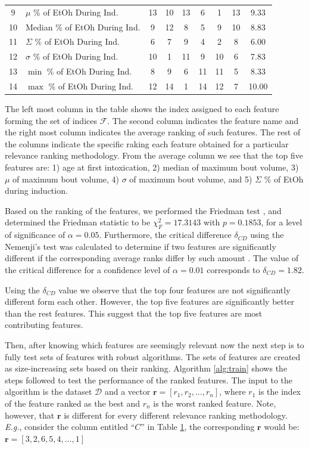 \documentclass{bmcart}
\begin{document}
\begin{table}[t]
\begin{tabular}{clccccccc}
9  & $\mu$ \% of EtOh During Ind.    &  13 &    10 &  13 &    6 &        1 &      13 &  9.33 \\
10 & Median \% of EtOh During Ind.   &   9 &    12 &   8 &    5 &        9 &      10 &  8.83 \\
11 & $\Sigma$ \% of EtOh During Ind. &   6 &     7 &   9 &    4 &        2 &       8 &  6.00 \\
12 & $\sigma$ \% of EtOh During Ind. &  10 &     1 &  11 &    9 &       10 &       6 &  7.83 \\
13 & $\min$ \% of EtOh During Ind.   &   8 &     9 &   6 &   11 &       11 &       5 &  8.33 \\ 
14 & $\max$ \% of EtOh During Ind.   &  12 &    14 &   1 &   14 &       12 &       7 & 10.00 \\ \hline
      \end{tabular}
\label{tbl:ranking}
\end{table}
The left most column in the table shows the index assigned to each feature
forming the set of indices $\mathcal{F}$. The second column 
indicates the feature name and the right most column
indicates the average ranking of such features. The rest of the columns
indicate the specific raking each feature obtained for a particular relevance
ranking methodology. From the average column we see that the top five features
are: 1) age at first intoxication, 2) median of maximum bout volume, 3) $\mu$ 
of maximum bout volume, 4) $\sigma$ of maximum bout volume, and 5) $\Sigma$ 
\% of EtOh during induction.

Based on the ranking of the features, 
we performed the Friedman test \cite{demvsar2006statistical}, and determined
the Friedman statistic to be $\chi_F^2 = 17.3143$ with $p=0.1853$, for
a level of significance of $\alpha=0.05$.  Furthermore, the critical difference
$\delta_{CD}$ using the Nemenji's test was calculated to determine if two
features are significantly different if the corresponding average ranks differ
by such amount \cite{garcia2010advanced}. 
The value of the critical difference for a confidence level of
$\alpha=0.01$ corresponds to $\delta_{CD}=1.82$. 

Using the $\delta_{CD}$ value we observe that the top four features are not
significantly different form each other. However, the top five features are
significantly better than the rest features. This suggest that the top five
features are most contributing features.

Then, after knowing which features are seemingly relevant now the next step is
to fully test sets of features with robust algorithms. The sets of features are
created as size-increasing sets based on their ranking. Algorithm
\ref{alg:train} shows the steps followed to test the performance of the ranked
features. The input to the algorithm is the dataset $\mathcal{D}$ and a vector
$\mathbf{r}=[r_1, r_2, \dots, r_n]$, where $r_1$ is the index of the feature
ranked as the best and $r_n$ is the worst ranked feature. Note, however, that
$\mathbf{r}$ is different for every different relevance ranking methodology.
\emph{E.g.}, consider the column entitled ``$C$'' in Table \ref{tbl:ranking}, the
corresponding $\mathbf{r}$ would be: $\mathbf{r}=[3, 2, 6, 5, 4, \dots, 1]$
\end{document}
